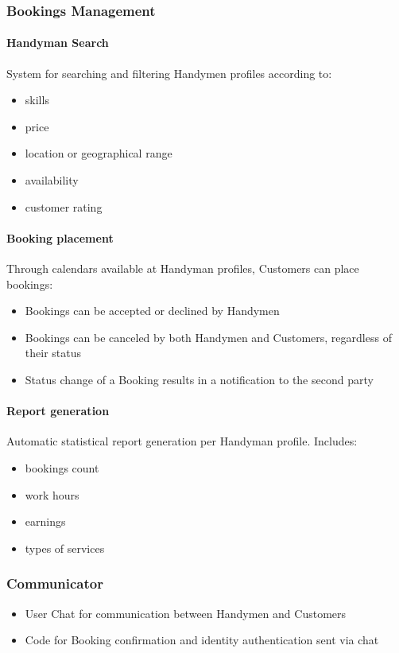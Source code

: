 \documentclass[11pt,a4paper]{article}
\begin{document}
\subsubsection{Bookings Management}

\paragraph{Handyman Search}

\item System for searching and filtering Handymen profiles according to:
\begin{itemize}
\item skills
\item price
\item location or geographical range
\item availability
\item customer rating
\end{itemize}

\paragraph{Booking placement}

Through calendars available at Handyman profiles, Customers can place bookings:
\begin{itemize}
\item Bookings can be accepted or declined by Handymen
\item Bookings can be canceled by both Handymen and Customers, regardless of their status
\item Status change of a Booking results in a notification to the second party
\end{itemize}

\paragraph{Report generation}

Automatic statistical report generation per Handyman profile. Includes: 
\begin{itemize}
\item bookings count
\item work hours
\item earnings
\item types of services
\end{itemize}

\subsubsection{Communicator}
\begin{itemize}
\item User Chat for communication between Handymen and Customers
\item Code for Booking confirmation and identity authentication sent via chat 
\end{itemize}
\end{document}
